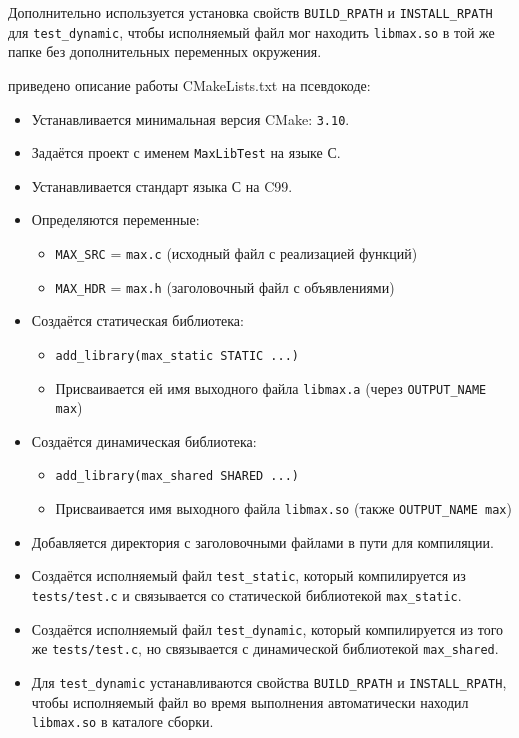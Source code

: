 Дополнительно используется установка свойств \texttt{BUILD\_RPATH} и \texttt{INSTALL\_RPATH} для \texttt{test\_dynamic}, чтобы исполняемый файл мог находить \texttt{libmax.so} в той же папке без дополнительных переменных окружения.

\vspace{.3cm}

 приведено описание работы CMakeLists.txt на псевдокоде:

\begin{itemize}
\item Устанавливается минимальная версия CMake: \texttt{3.10}.
\item Задаётся проект с именем \texttt{MaxLibTest} на языке С.
\item Устанавливается стандарт языка С на C99.

\item Определяются переменные:
\begin{itemize}
\item \texttt{MAX\_SRC} = \texttt{max.c} (исходный файл с реализацией функций)
\item \texttt{MAX\_HDR} = \texttt{max.h} (заголовочный файл с объявлениями)
\end{itemize}

\item Создаётся статическая библиотека:
\begin{itemize}
\item \texttt{add\_library(max\_static STATIC ...)}
\item Присваивается ей имя выходного файла \texttt{libmax.a} (через \texttt{OUTPUT\_NAME max})
\end{itemize}

\item Создаётся динамическая библиотека:
\begin{itemize}
\item \texttt{add\_library(max\_shared SHARED ...)}
\item Присваивается имя выходного файла \texttt{libmax.so} (также \texttt{OUTPUT\_NAME max})
\end{itemize}

\item Добавляется директория с заголовочными файлами в пути для компиляции.

\item Создаётся исполняемый файл \texttt{test\_static}, который компилируется из \texttt{tests/test.c} и связывается со статической библиотекой \texttt{max\_static}.

\item Создаётся исполняемый файл \texttt{test\_dynamic}, который компилируется из того же \texttt{tests/test.c}, но связывается с динамической библиотекой \texttt{max\_shared}.

\item Для \texttt{test\_dynamic} устанавливаются свойства \texttt{BUILD\_RPATH} и \texttt{INSTALL\_RPATH}, чтобы исполняемый файл во время выполнения автоматически находил \texttt{libmax.so} в каталоге сборки.
\end{itemize}

